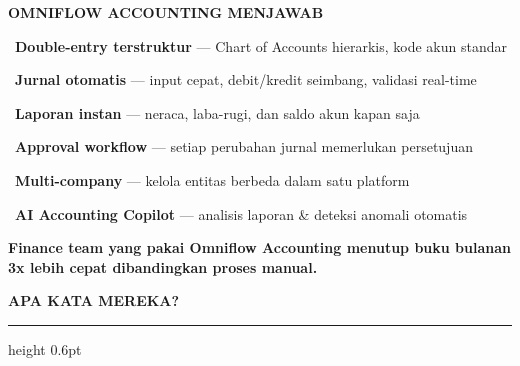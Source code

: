 \documentclass[a4paper]{article}
\newcommand{\sectiontitle}[1]{%
    \vspace{10pt}%
    {\fontsize{13}{16}\selectfont\bfseries\color{BlueDark} #1}\par\vspace{3pt}%
    {\color{BluePrimary}\hrule height 0.6pt}\par\vspace{8pt}%
}
\begin{document}
\begin{minipage}[t]{0.485\textwidth}
    \colorbox{TealPrimary}{%
        \begin{minipage}{\dimexpr\textwidth-14pt}
            \vspace{5pt}
            {\fontsize{10}{13}\selectfont\bfseries\color{White} OMNIFLOW ACCOUNTING MENJAWAB}
            \vspace{5pt}
        \end{minipage}}
    \vspace{6pt}

    {\fontsize{9.5}{13}\selectfont\color{TextDark}%
    \textbullet\ \textbf{Double-entry terstruktur} — Chart of Accounts hierarkis, kode akun standar\par\vspace{4pt}%
    \textbullet\ \textbf{Jurnal otomatis} — input cepat, debit/kredit seimbang, validasi real-time\par\vspace{4pt}%
    \textbullet\ \textbf{Laporan instan} — neraca, laba-rugi, dan saldo akun kapan saja\par\vspace{4pt}%
    \textbullet\ \textbf{Approval workflow} — setiap perubahan jurnal memerlukan persetujuan\par\vspace{4pt}%
    \textbullet\ \textbf{Multi-company} — kelola entitas berbeda dalam satu platform\par\vspace{4pt}%
    \textbullet\ \textbf{AI Accounting Copilot} — analisis laporan \& deteksi anomali otomatis}%
\end{minipage}

\vspace{8pt}

{\setlength{\fboxsep}{7pt}\setlength{\fboxrule}{0pt}%
\noindent\colorbox{TealPrimary}{%
    \begin{minipage}{\dimexpr\textwidth-2\fboxsep\relax}
        \centering
        {\fontsize{9.5}{12}\selectfont\bfseries\color{White}
        Finance team yang pakai Omniflow Accounting menutup buku bulanan \textbf{3x lebih cepat} dibandingkan proses manual.}
    \end{minipage}}}

\vspace{8pt}
\sectiontitle{APA KATA MEREKA?}
\end{document}
